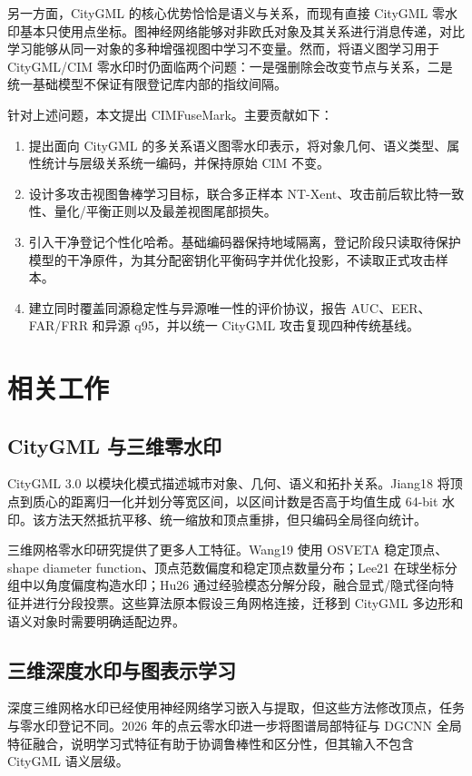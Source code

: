 \documentclass[UTF8,fontset=fandol,12pt]{ctexart}
\newcommand{\method}{CIMFuseMark}
\begin{document}
另一方面，CityGML 的核心优势恰恰是语义与关系，而现有直接 CityGML 零水印基本只使用点坐标。图神经网络能够对非欧氏对象及其关系进行消息传递\cite{Kipf2017,Hamilton2017}，对比学习能够从同一对象的多种增强视图中学习不变量\cite{Chen2020}。然而，将语义图学习用于 CityGML/CIM 零水印时仍面临两个问题：一是强删除会改变节点与关系，二是统一基础模型不保证有限登记库内部的指纹间隔。

针对上述问题，本文提出 \method。主要贡献如下：
\begin{enumerate}
  \item 提出面向 CityGML 的多关系语义图零水印表示，将对象几何、语义类型、属性统计与层级关系统一编码，并保持原始 CIM 不变。
  \item 设计多攻击视图鲁棒学习目标，联合多正样本 NT-Xent、攻击前后软比特一致性、量化/平衡正则以及最差视图尾部损失。
  \item 引入干净登记个性化哈希。基础编码器保持地域隔离，登记阶段只读取待保护模型的干净原件，为其分配密钥化平衡码字并优化投影，不读取正式攻击样本。
  \item 建立同时覆盖同源稳定性与异源唯一性的评价协议，报告 AUC、EER、FAR/FRR 和异源 q95，并以统一 CityGML 攻击复现四种传统基线。
\end{enumerate}

\section{相关工作}
\subsection{CityGML 与三维零水印}
CityGML 3.0 以模块化模式描述城市对象、几何、语义和拓扑关系\cite{OGCCityGML3}。Jiang18 将顶点到质心的距离归一化并划分等宽区间，以区间计数是否高于均值生成 64-bit 水印\cite{Jiang2018}。该方法天然抵抗平移、统一缩放和顶点重排，但只编码全局径向统计。

三维网格零水印研究提供了更多人工特征。Wang19 使用 OSVETA 稳定顶点、shape diameter function、顶点范数偏度和稳定顶点数量分布\cite{Wang2019}；Lee21 在球坐标分组中以角度偏度构造水印\cite{Lee2021}；Hu26 通过经验模态分解分段，融合显式/隐式径向特征并进行分段投票\cite{Hu2026}。这些算法原本假设三角网格连接，迁移到 CityGML 多边形和语义对象时需要明确适配边界。

\subsection{三维深度水印与图表示学习}
深度三维网格水印已经使用神经网络学习嵌入与提取\cite{WangDeepMesh2022,ZhuDeep3DMark2024}，但这些方法修改顶点，任务与零水印登记不同。2026 年的点云零水印进一步将图谱局部特征与 DGCNN 全局特征融合\cite{ZhangPointZW2026}，说明学习式特征有助于协调鲁棒性和区分性，但其输入不包含 CityGML 语义层级。
\end{document}
